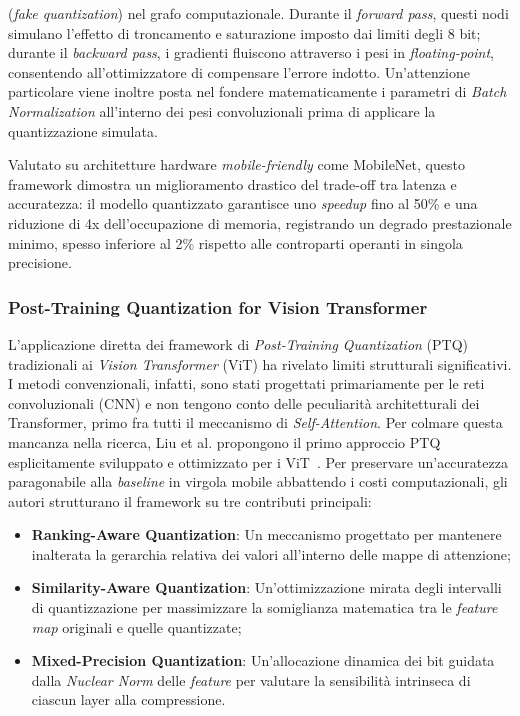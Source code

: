 (\textit{fake quantization}) nel grafo computazionale. Durante il
\textit{forward pass}, questi nodi simulano l'effetto di troncamento e
saturazione imposto dai limiti degli 8 bit; durante il \textit{backward pass},
i gradienti fluiscono attraverso i pesi in \textit{floating-point}, consentendo
all'ottimizzatore di compensare l'errore indotto. Un'attenzione particolare
viene inoltre posta nel fondere matematicamente i parametri di \textit{Batch
    Normalization} all'interno dei pesi convoluzionali prima di applicare la
quantizzazione simulata. \par
Valutato su architetture hardware \textit{mobile-friendly} come MobileNet,
questo framework dimostra un miglioramento drastico del trade-off tra latenza e
accuratezza: il modello quantizzato garantisce uno \textit{speedup} fino al
50\% e una riduzione di 4x dell'occupazione di memoria, registrando un degrado
prestazionale minimo, spesso inferiore al 2\% rispetto alle controparti
operanti in singola precisione.
\subsubsection{Post-Training Quantization for Vision Transformer}
L'applicazione diretta dei framework di \textit{Post-Training Quantization}
(PTQ) tradizionali ai \textit{Vision Transformer} (ViT) ha rivelato limiti
strutturali significativi. I metodi convenzionali, infatti, sono stati
progettati primariamente per le reti convoluzionali (CNN) e non tengono conto
delle peculiarità architetturali dei Transformer, primo fra tutti il meccanismo
di \textit{Self-Attention}. Per colmare questa mancanza nella ricerca, Liu et
al. propongono il primo approccio PTQ esplicitamente sviluppato e ottimizzato
per i ViT~\cite{liu2021posttrainingquantizationvisiontransformer}. Per
preservare un'accuratezza paragonabile alla \textit{baseline} in virgola mobile
abbattendo i costi computazionali, gli autori strutturano il framework su tre
contributi principali:
\begin{itemize}
    \item \textbf{Ranking-Aware Quantization}: Un meccanismo progettato per mantenere inalterata la gerarchia relativa dei valori all'interno delle mappe di attenzione;
    \item \textbf{Similarity-Aware Quantization}: Un'ottimizzazione mirata degli intervalli di quantizzazione per massimizzare la somiglianza matematica tra le \textit{feature map} originali e quelle quantizzate;
    \item \textbf{Mixed-Precision Quantization}: Un'allocazione dinamica dei bit guidata dalla \textit{Nuclear Norm} delle \textit{feature} per valutare la sensibilità intrinseca di ciascun layer alla compressione.
\end{itemize}

